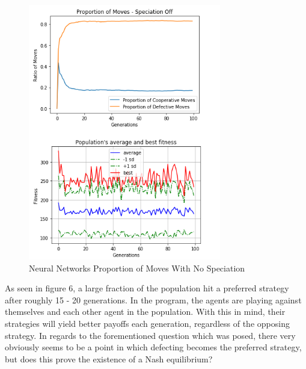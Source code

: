 \documentclass[12pt,a4paper]{article}
\begin{document}
\begin{figure}[H]
	\centering
		\includegraphics[width=0.75\textwidth]{RatioSpeciationOff}
		\caption{Neural Networks Proportion of Moves With No Speciation}
\end{figure}

As seen in figure 6, a large fraction of the population hit a preferred strategy after roughly 15 - 20 generations. In the program, the agents are playing against themselves and each other agent in the population. With this in mind, their strategies will yield better payoffs each generation, regardless of the opposing strategy. In regards to the forementioned question which was posed, there very obviously seems to be a point in which defecting becomes the preferred strategy, but does this prove the existence of a Nash equilibrium?
\end{document}
